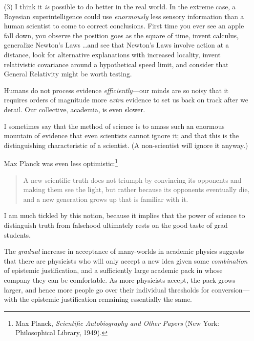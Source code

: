 {
 (3) I think it \textit{is} possible to do better in the real
world. In the extreme case, a Bayesian superintelligence could use
\textit{enormously} less sensory information than a human scientist to
come to correct conclusions. First time you ever see an apple fall
down, you observe the position goes as the square of time, invent
calculus, generalize Newton's Laws \ldots and see that
Newton's Laws involve action at a distance, look for
alternative explanations with increased locality, invent relativistic
covariance around a hypothetical speed limit, and consider that General
Relativity might be worth testing.}

{
 Humans do not process evidence \textit{efficiently}{}---our minds
are so noisy that it requires orders of magnitude more \textit{extra}
evidence to set us back on track after we derail. Our collective,
academia, is even slower.}

\myendsectiontext


\bigskip


{
 I sometimes say that the method of science is to amass such an
enormous mountain of evidence that even scientists cannot ignore it;
and that this is the distinguishing characteristic of a scientist. (A
non-scientist will ignore it anyway.) }

{
 Max Planck was even less optimistic:\footnote{Max Planck, \textit{Scientific Autobiography and Other Papers}
(New York: Philosophical Library, 1949).}}

\begin{quote}
{
 A new scientific truth does not triumph by convincing its
opponents and making them see the light, but rather because its
opponents eventually die, and a new generation grows up that is
familiar with it.}
\end{quote}

{
 I am much tickled by this notion, because it implies that the
power of science to distinguish truth from falsehood ultimately rests
on the good taste of grad students.}

{
 The \textit{gradual} increase in acceptance of many-worlds in
academic physics suggests that there are physicists who will only
accept a new idea given some \textit{combination} of epistemic
justification, and a sufficiently large academic pack in whose company
they can be comfortable. As more physicists accept, the pack grows
larger, and hence more people go over their individual thresholds for
conversion---with the epistemic justification remaining essentially the
same.}

